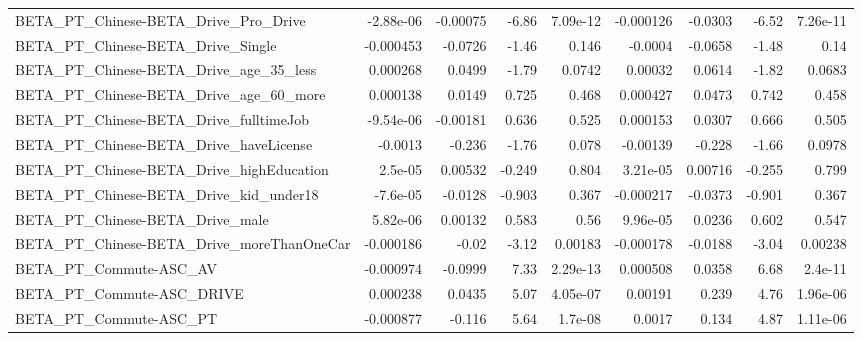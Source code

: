 \begin{tabular}{lrrrrrrrr}
BETA\_PT\_Chinese-BETA\_Drive\_Pro\_Drive               &   -2.88e-06 &     -0.00075 &     -6.86 & 7.09e-12 &  -0.000126 &     -0.0303 &        -6.52 &      7.26e-11 \\
BETA\_PT\_Chinese-BETA\_Drive\_Single                  &   -0.000453 &      -0.0726 &     -1.46 &    0.146 &    -0.0004 &     -0.0658 &        -1.48 &          0.14 \\
BETA\_PT\_Chinese-BETA\_Drive\_age\_35\_less             &    0.000268 &       0.0499 &     -1.79 &   0.0742 &    0.00032 &      0.0614 &        -1.82 &        0.0683 \\
BETA\_PT\_Chinese-BETA\_Drive\_age\_60\_more             &    0.000138 &       0.0149 &     0.725 &    0.468 &   0.000427 &      0.0473 &        0.742 &         0.458 \\
BETA\_PT\_Chinese-BETA\_Drive\_fulltimeJob             &   -9.54e-06 &     -0.00181 &     0.636 &    0.525 &   0.000153 &      0.0307 &        0.666 &         0.505 \\
BETA\_PT\_Chinese-BETA\_Drive\_haveLicense             &     -0.0013 &       -0.236 &     -1.76 &    0.078 &   -0.00139 &      -0.228 &        -1.66 &        0.0978 \\
BETA\_PT\_Chinese-BETA\_Drive\_highEducation           &     2.5e-05 &      0.00532 &    -0.249 &    0.804 &   3.21e-05 &     0.00716 &       -0.255 &         0.799 \\
BETA\_PT\_Chinese-BETA\_Drive\_kid\_under18             &    -7.6e-05 &      -0.0128 &    -0.903 &    0.367 &  -0.000217 &     -0.0373 &       -0.901 &         0.367 \\
BETA\_PT\_Chinese-BETA\_Drive\_male                    &    5.82e-06 &      0.00132 &     0.583 &     0.56 &   9.96e-05 &      0.0236 &        0.602 &         0.547 \\
BETA\_PT\_Chinese-BETA\_Drive\_moreThanOneCar          &   -0.000186 &        -0.02 &     -3.12 &  0.00183 &  -0.000178 &     -0.0188 &        -3.04 &       0.00238 \\
BETA\_PT\_Commute-ASC\_AV                             &   -0.000974 &      -0.0999 &      7.33 & 2.29e-13 &   0.000508 &      0.0358 &         6.68 &       2.4e-11 \\
BETA\_PT\_Commute-ASC\_DRIVE                          &    0.000238 &       0.0435 &      5.07 & 4.05e-07 &    0.00191 &       0.239 &         4.76 &      1.96e-06 \\
BETA\_PT\_Commute-ASC\_PT                             &   -0.000877 &       -0.116 &      5.64 &  1.7e-08 &     0.0017 &       0.134 &         4.87 &      1.11e-06 \\

\end{tabular}
